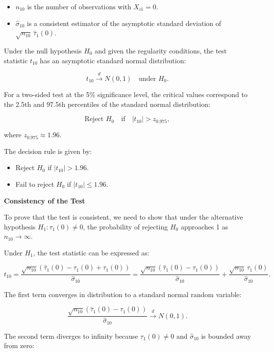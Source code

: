 \documentclass{article}
\begin{document}
\begin{itemize}
    \item \( n_{10} \) is the number of observations with \( X_{i1} = 0 \).
    \item \( \hat{\sigma}_{10} \) is a consistent estimator of the asymptotic standard deviation of \( \sqrt{n_{10}} \, \hat{\tau}_1(0) \).
\end{itemize}

Under the null hypothesis \( H_0 \) and given the regularity conditions, the test statistic \( t_{10} \) has an asymptotic standard normal distribution:

\[
t_{10} \xrightarrow{d} N(0,1) \quad \text{under } H_0.
\]

For a two-sided test at the 5\% significance level, the critical values correspond to the 2.5th and 97.5th percentiles of the standard normal distribution:

\[
\text{Reject } H_0 \quad \text{if} \quad |t_{10}| > z_{0.975},
\]

where \( z_{0.975} \approx 1.96 \).

The decision rule is given by:

\begin{itemize}
    \item Reject \( H_0 \) if \( |t_{10}| > 1.96 \).
    \item Fail to reject \( H_0 \) if \( |t_{10}| \leq 1.96 \).
\end{itemize}

\textbf{Consistency of the Test}

To prove that the test is consistent, we need to show that under the alternative hypothesis \( H_1: \tau_1(0) \neq 0 \), the probability of rejecting \( H_0 \) approaches 1 as \( n_{10} \to \infty \).

Under \( H_1 \), the test statistic can be expressed as:

\[
t_{10} = \frac{\sqrt{n_{10}} \left( \hat{\tau}_1(0) - \tau_1(0) + \tau_1(0) \right)}{\hat{\sigma}_{10}} = \frac{\sqrt{n_{10}} \left( \hat{\tau}_1(0) - \tau_1(0) \right)}{\hat{\sigma}_{10}} + \frac{\sqrt{n_{10}} \, \tau_1(0)}{\hat{\sigma}_{10}}.
\]

The first term converges in distribution to a standard normal random variable:

\[
\frac{\sqrt{n_{10}} \left( \hat{\tau}_1(0) - \tau_1(0) \right)}{\hat{\sigma}_{10}} \xrightarrow{d} N(0,1).
\]

The second term diverges to infinity because \( \tau_1(0) \neq 0 \) and \( \hat{\sigma}_{10} \) is bounded away from zero:
\end{document}
